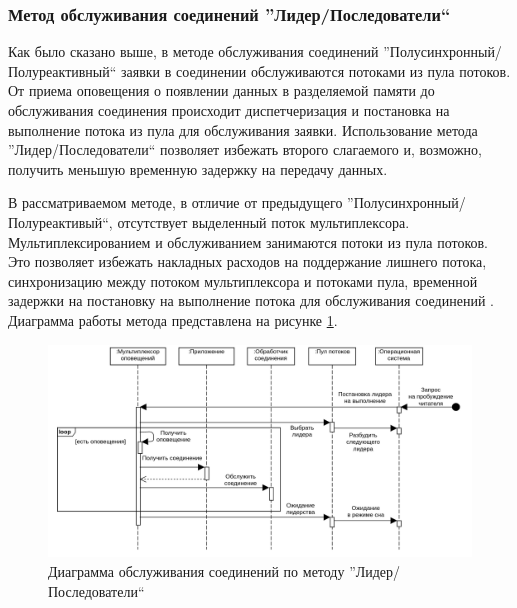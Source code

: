 \subsubsection{Метод обслуживания соединений ''Лидер/Последователи``}\label{chapter31:BlockingLF}

Как было сказано выше, в методе обслуживания соединений ''Полусинхронный/Полуреактивный`` заявки в соединении обслуживаются потоками из пула потоков. От приема оповещения о появлении данных в разделяемой памяти до обслуживания соединения происходит диспетчеризация и постановка на выполнение потока из пула для обслуживания заявки. Использование метода ''Лидер/Последователи`` \cite{schmidt1998leader} позволяет избежать второго слагаемого и, возможно, получить меньшую временную задержку на передачу данных.

В рассматриваемом методе, в отличие от предыдущего ''Полусинхронный/Полуреактивый``, отсутствует выделенный поток мультиплексора. Мультиплексированием и обслуживанием занимаются потоки из пула потоков. Это позволяет избежать накладных расходов на поддержание лишнего потока, синхронизацию между потоком мультиплексора и потоками пула, временной задержки на постановку на выполнение потока для обслуживания соединений \cite[41]{POSA2}. Диаграмма работы метода представлена на рисунке \ref{chapter31:LFMuxSchema}.

\begin{figure}[!h]
\caption{Диаграмма обслуживания соединений по методу ''Лидер/Последователи``}
\label{chapter31:LFMuxSchema}
\includegraphics[width=\textwidth]{../../graphics/schemes/LFMuxSequence}
\end{figure}

